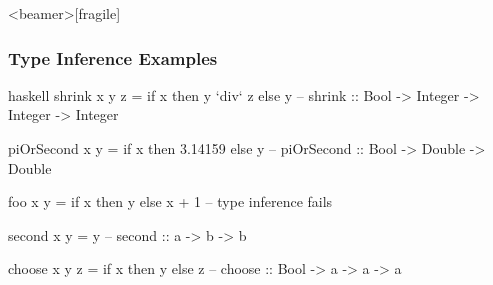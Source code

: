 \documentclass[dvipsnames]{beamer}
\theoremstyle{plain}
\begin{document}
\begin{frame}<beamer>[fragile]
  \frametitle{Type Inference Examples}

  \begin{example}[Haskell]
    \begin{pygments}{haskell}
shrink x y z = if x then y `div` z else y
-- shrink :: Bool -> Integer -> Integer -> Integer

piOrSecond x y = if x then 3.14159 else y
-- piOrSecond :: Bool -> Double -> Double

foo x y = if x then y else x + 1
-- type inference fails

second x y = y
-- second :: a -> b -> b

choose x y z = if x then y else z
-- choose :: Bool -> a -> a -> a
    \end{pygments}
  \end{example}
\end{frame}
% 
% 
% 
\end{document}
